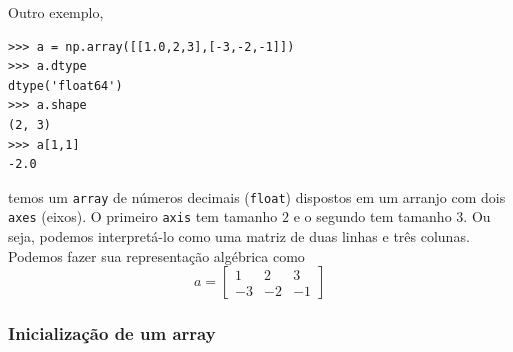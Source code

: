 \documentclass[12pt]{article}
\begin{document}
Outro exemplo,

\begin{lstlisting}
>>> a = np.array([[1.0,2,3],[-3,-2,-1]])
>>> a.dtype
dtype('float64')
>>> a.shape
(2, 3)
>>> a[1,1]
-2.0
\end{lstlisting}

temos um \lstinline+array+ de números decimais (\lstinline+float+) dispostos em um arranjo com dois \lstinline+axes+ (eixos). O primeiro \lstinline+axis+ tem tamanho $2$ e o segundo tem tamanho $3$. Ou seja, podemos interpretá-lo como uma matriz de duas linhas e três colunas. Podemos fazer sua representação algébrica como
\begin{equation}
  a =
  \begin{bmatrix}
    1 & 2 & 3\\
    -3 & -2 & -1 
  \end{bmatrix}
\end{equation}

\subsubsection{Inicialização de um array}\label{subsubsection:iniarray}
\end{document}
